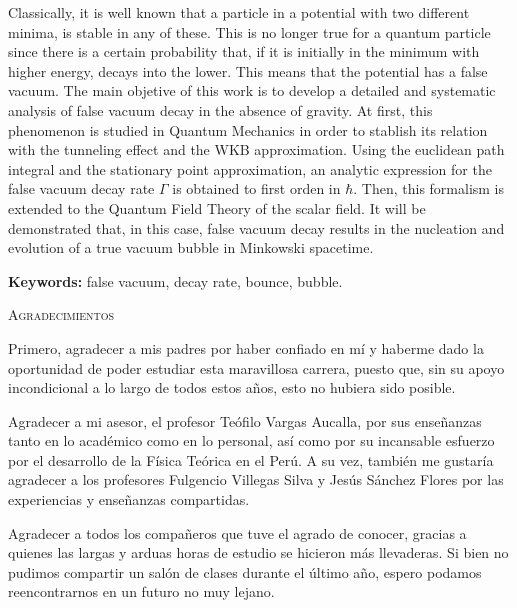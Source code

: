 \documentclass[12pt, a4paper, oneside]{book}
\begin{document}
\noindent
Classically, it is well known that a particle in a potential with two different minima, is stable in any of these. This is no longer true for a quantum particle since there is a certain probability that, if it is initially in the minimum with higher energy, decays into the lower. This means that the potential has a false vacuum. The main objetive of this work is to develop a detailed and systematic analysis of false vacuum decay in the absence of gravity. At first, this phenomenon is studied in Quantum Mechanics in order to stablish its relation with the tunneling effect   and the WKB approximation. Using the euclidean path integral and the stationary point approximation, an analytic expression for the false vacuum decay rate $\Gamma$ is obtained to first orden in $\hbar$.
Then, this formalism is extended to the Quantum Field Theory of the scalar field. It will be demonstrated that, in this case, false vacuum decay results in the nucleation and evolution of a true vacuum bubble in Minkowski spacetime.

\hfill

\noindent
\textbf{Keywords:} false vacuum, decay rate, bounce, bubble.

\newpage


\begin{center}
	\thispagestyle{plain}
	
	\setlength{\parskip}{0pt}
	{\huge{\textsc{Agradecimientos}} \par}
\end{center}

Primero, agradecer a mis padres por haber confiado en mí y haberme dado la oportunidad de poder estudiar esta maravillosa carrera, puesto que, sin su apoyo incondicional a lo largo de todos estos años, esto no hubiera sido posible. 

Agradecer a mi asesor, el profesor Teófilo Vargas Aucalla, por sus enseñanzas tanto en lo académico como en lo personal, así como por su incansable esfuerzo por el desarrollo de la Física Teórica en el Perú.  
A su vez, también me gustaría agradecer a los profesores Fulgencio Villegas Silva y Jesús Sánchez Flores por las experiencias y enseñanzas compartidas. 

Agradecer a todos los compañeros que tuve el agrado de conocer, gracias a quienes las largas y arduas horas de estudio se hicieron más llevaderas. Si bien no pudimos compartir un salón de clases durante el último año, espero podamos reencontrarnos en un futuro no muy lejano. 
\end{document}

